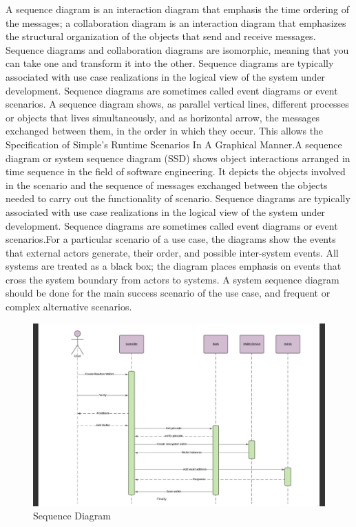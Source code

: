 \documentclass[12pt]{article}
\begin{document}
A sequence diagram is an interaction diagram that emphasis the time
ordering of the messages; a collaboration diagram is an interaction diagram that
emphasizes the structural organization of the objects that send and receive messages.
Sequence diagrams and collaboration diagrams are isomorphic, meaning that you
can take one and transform it into the other. Sequence diagrams are typically
associated with use case realizations in the logical view of the system under
development. Sequence diagrams are sometimes called event diagrams or event
scenarios. A sequence diagram shows, as parallel vertical lines, different processes or
objects that lives simultaneously, and as horizontal arrow, the messages exchanged
between them, in the order in which they occur. This allows the Specification of
Simple’s Runtime Scenarios In A Graphical Manner.A sequence
diagram or system sequence diagram (SSD) shows object interactions arranged in time
sequence in the field of software engineering. It depicts the objects involved in the scenario and the sequence of messages exchanged between the objects needed to carry out
the functionality of scenario. Sequence diagrams are typically associated with use case
realizations in the logical view of the system under development. Sequence diagrams
are sometimes called event diagrams or event scenarios.For a particular scenario of a
use case, the diagrams show the events that external actors generate, their order, and
possible inter-system events. All systems are treated as a black box; the diagram places
emphasis on events that cross the system boundary from actors to systems. A system
sequence diagram should be done for the main success scenario of the use case, and
frequent or complex alternative scenarios.


\begin{figure}[h!]
\begin{center}
\includegraphics[scale=.91]{SEQ}
\caption{Sequence Diagram}
\end{center}
\end{figure}
\end{document}
